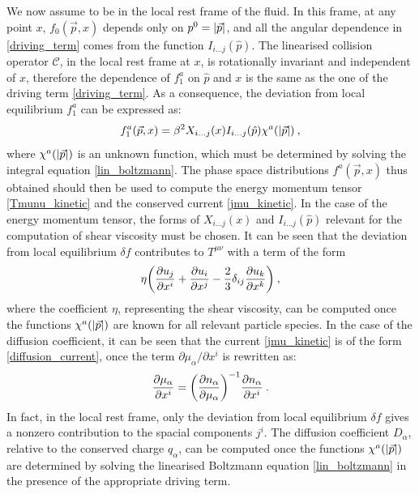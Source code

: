  We now assume to be in the local rest frame of the fluid. In this frame, at any point $x$, $f_0(\vec p,x)$ depends only on $p^0 = \abs{\vec p}$, and all the angular dependence in \ref{driving_term} comes from the function $I_{i \dots j}(\hat p)$. The linearised collision operator $\mathcal{C}$, in the local rest frame at $x$, is rotationally invariant and independent of $x$, therefore the dependence of $f_1^a$ on $\hat p$ and $x$ is the same as the one of the driving term \ref{driving_term}. As a consequence, the deviation from local equilibrium $f_1^a$ can be expressed as:
  \begin{equation}
 f_1^a (\vec p,x) = \beta^2 X_{i \dots j} (x) I_{i \dots j} (\hat p) \chi^a(\abs{\vec p}) \: ,
 \label{f1}
 \end{equation}
 where $\chi^a(\abs{\vec p})$ is an unknown function, which must be determined by solving the integral equation \ref{lin_boltzmann}. The phase space distributions $f^a(\vec p,x)$ thus obtained should then be used to compute the energy momentum tensor \ref{Tmunu_kinetic}  and the conserved current \ref{jmu_kinetic}. In the case of the energy momentum tensor, the forms of $X_{i \dots j}(x)$ and $I_{i \dots j}(\hat p)$ relevant for the computation of shear viscosity must be chosen. It can be seen that the deviation from local equilibrium $\delta f$ contributes to $T^{\mu\nu}$ with a term of the form
  \begin{equation}
 \eta \biggl( \frac{\partial  u_j}{\partial x^i}  + \frac{\partial  u_i}{\partial x^j}  -\frac{2}{3} \delta_{ij} \frac{\partial  u_k}{\partial x^k}  \biggr) \: ,
 \end{equation} 
where the coefficient $\eta$, representing the shear viscosity, can be computed once the functions $\chi^a(\abs{\vec p})$ are known for all relevant particle species. In the case of the diffusion coefficient, it can be seen that the current \ref{jmu_kinetic} is of the form \ref{diffusion_current}, once the term $\partial \mu_{\alpha}/\partial x^i$ is rewritten as:
\begin{equation}
\frac{\partial \mu_{\alpha} }{\partial x^i}  = \biggl(\frac{\partial n_{\alpha}}{\partial  \mu_{\alpha}}\biggr)^{-1} \frac{\partial n_{\alpha} }{\partial x^i}  \: .
\end{equation}
%
In fact, in the local rest frame, only the deviation from local equilibrium $\delta f$ gives a nonzero contribution to the spacial components $j^i$.
The diffusion coefficient $D_{\alpha}$, relative to the conserved charge $q_{\alpha}$, can be computed once the functions $\chi^a(\abs{\vec p})$ are determined by solving the linearised Boltzmann equation \ref{lin_boltzmann} in the presence of the appropriate driving term.

